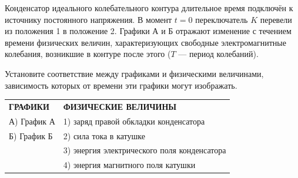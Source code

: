 \begin{taskbasic}[code={\label{task:elem_osc_v19_n15}}]
Конденсатор идеального колебательного контура длительное время подключён к источнику постоянного напряжения. В момент $t = 0$ переключатель $K$ перевели из положения 1 в положение 2. Графики А и Б отражают изменение с течением времени физических величин, характеризующих свободные электромагнитные колебания, возникшие в контуре после этого ($T$ --- период колебаний).

\nopagebreak\smallskip
\begin{center}
\qquad
{}
\end{center}

Установите соответствие между графиками и физическими величинами, зависимость которых от времени эти графики могут изображать.

\smallskip
\begin{tabular}{p{}p{}}
\textbf{ГРАФИКИ} & \textbf{ФИЗИЧЕСКИЕ ВЕЛИЧИНЫ} \\
А) График А & 1) заряд правой обкладки конденсатора \\
Б) График Б & 2) сила тока в катушке \\
& 3) энергия электрического поля конденсатора \\
& 4) энергия магнитного поля катушки
\end{tabular}

\end{taskbasic}

